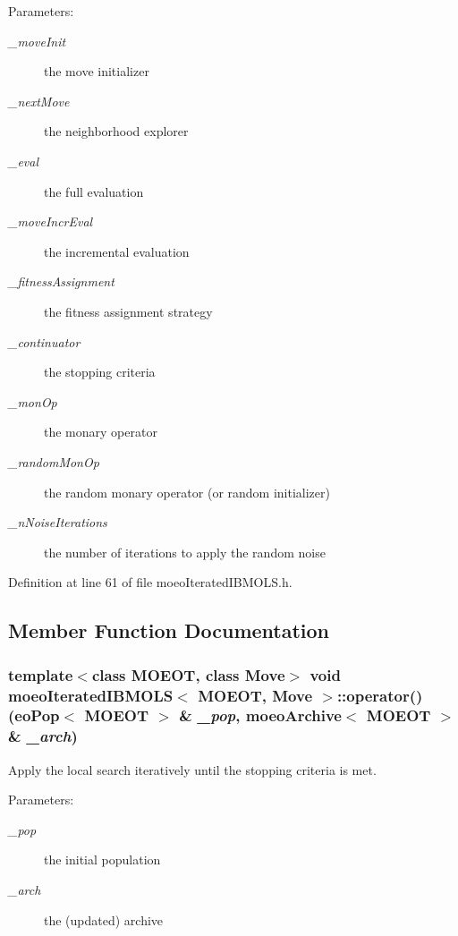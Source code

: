 \begin{Desc}
\item[Parameters:]
\begin{description}
\item[{\em \_\-move\-Init}]the move initializer \item[{\em \_\-next\-Move}]the neighborhood explorer \item[{\em \_\-eval}]the full evaluation \item[{\em \_\-move\-Incr\-Eval}]the incremental evaluation \item[{\em \_\-fitness\-Assignment}]the fitness assignment strategy \item[{\em \_\-continuator}]the stopping criteria \item[{\em \_\-mon\-Op}]the monary operator \item[{\em \_\-random\-Mon\-Op}]the random monary operator (or random initializer) \item[{\em \_\-n\-Noise\-Iterations}]the number of iterations to apply the random noise \end{description}
\end{Desc}


Definition at line 61 of file moeo\-Iterated\-IBMOLS.h.

\subsection{Member Function Documentation}
\subsubsection{\setlength{\rightskip}{0pt plus 5cm}template$<$class MOEOT, class Move$>$ void \bf{moeo\-Iterated\-IBMOLS}$<$ MOEOT, Move $>$::operator() (\bf{eo\-Pop}$<$ MOEOT $>$ \& {\em \_\-pop}, \bf{moeo\-Archive}$<$ MOEOT $>$ \& {\em \_\-arch})\hspace{0.3cm}{\tt  [inline, virtual]}}\label{classmoeoIteratedIBMOLS_52d4aa19a93c69ed0c2246c62821e76e}


Apply the local search iteratively until the stopping criteria is met. 

\begin{Desc}
\item[Parameters:]
\begin{description}
\item[{\em \_\-pop}]the initial population \item[{\em \_\-arch}]the (updated) archive \end{description}
\end{Desc}


